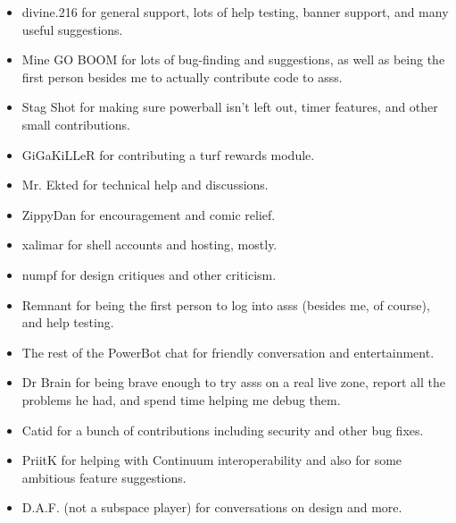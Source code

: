 \documentclass{article}
\newcommand{\asss}{asss}
\begin{document}
\begin{itemize}

\item{divine.216} for general support, lots of help testing, banner
support, and many useful suggestions.

\item{Mine GO BOOM} for lots of bug-finding and suggestions, as well as
being the first person besides me to actually contribute code to
\asss{}.

\item{Stag Shot} for making sure powerball isn't left out, timer
features, and other small contributions.

\item{GiGaKiLLeR} for contributing a turf rewards module.

\item{Mr. Ekted} for technical help and discussions.

\item{ZippyDan} for encouragement and comic relief.

\item{xalimar} for shell accounts and hosting, mostly.

\item{numpf} for design critiques and other criticism.

\item{Remnant} for being the first person to log into \asss{} (besides
me, of course), and help testing.

\item{The rest of the PowerBot chat} for friendly conversation and
entertainment.

\item{Dr Brain} for being brave enough to try \asss{} on a real live
zone, report all the problems he had, and spend time helping me debug
them.

\item{Catid} for a bunch of contributions including security and other
bug fixes.

\item{PriitK} for helping with Continuum interoperability and also for
some ambitious feature suggestions.


\item{D.A.F. (not a subspace player)} for conversations on design and
more.

\end{itemize}
\end{document}
